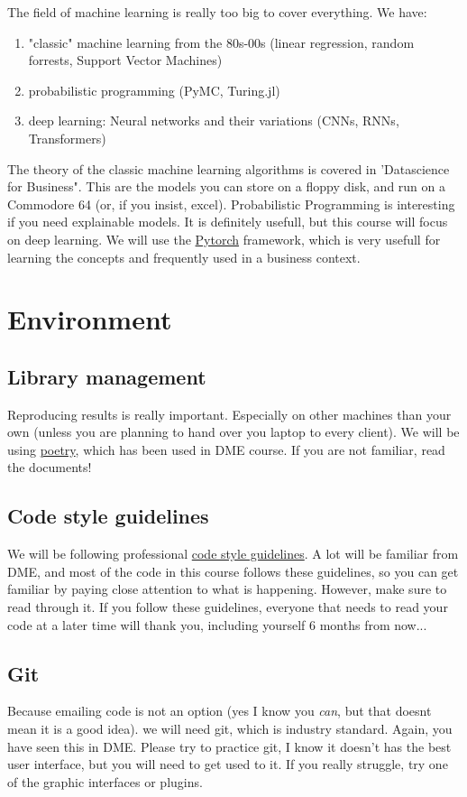 \documentclass[10pt]{article}
\begin{document}
\par The field of machine learning is really too big to cover everything. 
We have:
\begin{enumerate}[I]
    \item "classic" machine learning from the 80s-00s (linear regression, random forrests, 
    Support Vector Machines) 
    \item probabilistic programming (PyMC, Turing.jl)
    \item deep learning: Neural networks and their variations (CNNs, RNNs, Transformers)
\end{enumerate}

The theory of the classic machine learning algorithms is covered in 'Datascience for Business".
This are the models you can store on a floppy disk, and run on a Commodore 64 (or, if you insist, excel).
Probabilistic Programming is interesting if you need explainable models. It is definitely 
usefull, but this course will focus on deep learning.
We will use the \href{https://pytorch.org/}{Pytorch} framework, which is very usefull for learning 
the concepts and frequently used in a business context.

\section{Environment}
\subsection{Library management}
Reproducing results is really important. Especially on other machines than your own (unless
you are planning to hand over you laptop to every client).
We will be using \href{https://python-poetry.org/}{poetry}, which has been used in DME course.
If you are not familiar, read the documents!
\subsection{Code style guidelines}
We will be following professional \href{https://staticsitecodestyle.z6.web.core.windows.net/}{code style guidelines}. 
A lot will be familiar from DME, and most of the code in this course follows these guidelines, so you 
can get familiar by paying close attention to what is happening.
However, make sure to read through it. If you follow these 
guidelines, everyone that needs to read your code at a later time will thank you, including
yourself 6 months from now...
\subsection{Git}
Because emailing code is not an option (yes I know you \textit{can}, but that doesnt mean it is a good idea).
we will need git, which is industry standard. Again, you have seen this in DME. Please try to practice git,
I know it doesn't has the best user interface, but you will need to get used to it. If you really struggle,
try one of the graphic interfaces or plugins.  
\end{document}
